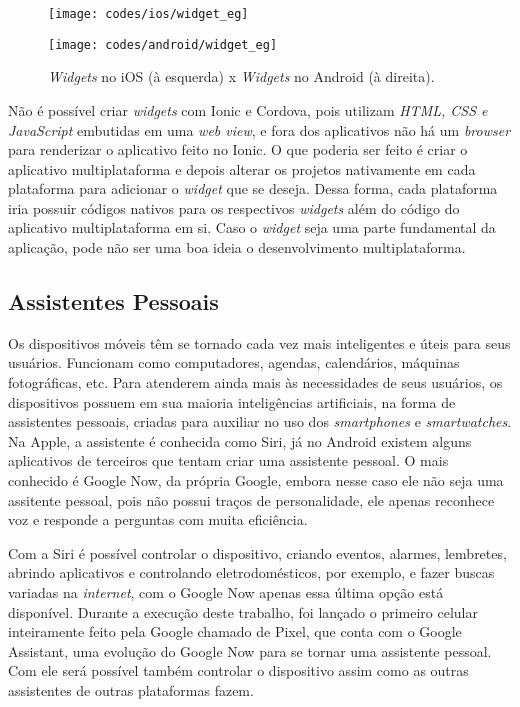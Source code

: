 \begin{figure}[H]
	\centering
	\begin{minipage}{.5\textwidth}
		\centering
		\texttt{[image: codes/ios/widget\_eg]}
	\end{minipage}%
	\begin{minipage}{.5\textwidth}
		\centering
		\texttt{[image: codes/android/widget\_eg]}
	\end{minipage}
\caption[\textit{Widgets} no iOS (à esquerda) x \textit{Widgets} no Android (à direita).]{\textit{Widgets} no iOS (à esquerda) x \textit{Widgets} no Android (à direita).}
\label{fig:widgets_sample}
\end{figure}

Não é possível criar \textit{widgets} com Ionic e Cordova, pois utilizam \textit{HTML, CSS e JavaScript} embutidas em uma \textit{web view}, e fora dos aplicativos não há um \textit{browser} para renderizar o aplicativo 
feito no Ionic. O que poderia ser feito é criar o aplicativo multiplataforma e depois alterar os projetos nativamente em cada plataforma para adicionar o \textit{widget} que se deseja. Dessa forma, cada plataforma iria 
possuir códigos nativos para os respectivos \textit{widgets} além do código do aplicativo multiplataforma em si. Caso o \textit{widget} seja uma parte fundamental da aplicação, pode não ser uma boa ideia o 
desenvolvimento multiplataforma. 

\subsection{Assistentes Pessoais} \label{subsec:siri}
Os dispositivos móveis têm se tornado cada vez mais inteligentes e úteis para seus usuários. Funcionam como computadores, agendas, calendários, máquinas fotográficas, etc. Para atenderem ainda mais às necessidades de 
seus usuários, os dispositivos possuem em sua maioria inteligências artificiais, na forma de assistentes pessoais, criadas para auxiliar no uso dos \textit{smartphones} e \textit{smartwatches}. 
Na Apple, a assistente é conhecida como Siri, já no Android existem alguns aplicativos de terceiros que tentam criar uma assistente pessoal. O mais conhecido é Google Now, da própria Google, 
embora nesse caso ele não seja uma assitente pessoal, pois não possui traços de personalidade, ele apenas reconhece voz e responde a perguntas com muita eficiência.

Com a Siri é possível controlar o dispositivo, criando eventos, alarmes, lembretes, abrindo aplicativos e controlando eletrodomésticos, por exemplo, e fazer buscas variadas na \textit{internet}, com o Google Now 
apenas essa última opção está disponível. Durante a execução deste trabalho, foi lançado o primeiro celular inteiramente feito pela Google chamado de Pixel, que conta com o Google Assistant, uma evolução do Google Now 
para se tornar uma assistente pessoal. Com ele será possível também controlar o dispositivo assim como as outras assistentes de outras plataformas fazem. 

